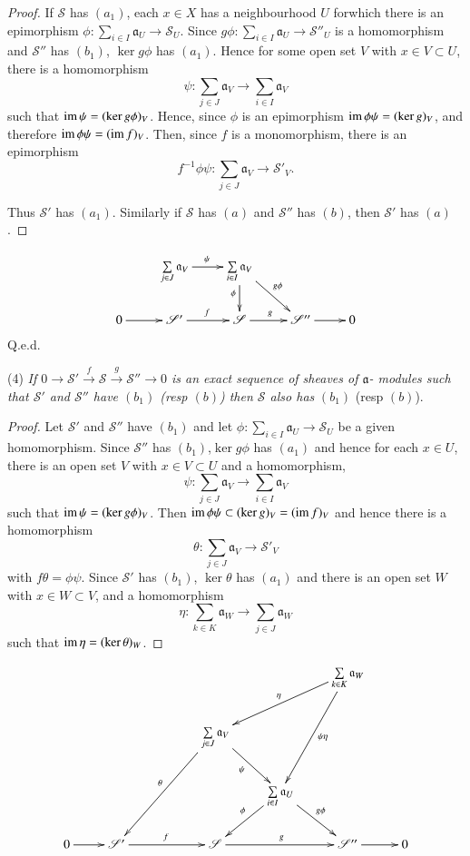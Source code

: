 \begin{proof}
If $\mathscr{S}$ has $(a_1)$, each $x \in X$ has a neighbourhood $U$
for\pageoriginale which there is an epimorphism $\phi : \sum\limits_{i
  \in I} \mathfrak{a}_U 
\to \mathscr{S}_U$. Since $g \phi : \sum \limits_{i \in I} \mathfrak{a}_U \to
\mathscr{S}''_U$ is a homomorphism and $\mathscr{S}''$ has $(b_1)$,
$\ker g \phi $ has $(a_1)$. Hence for some open set $V$ with $x \in V
\subset U$, there is a homomorphism 
$$
\psi: \sum_{j \in J} \mathfrak{a}_V \to \sum_{i \in I} \mathfrak{a}_V
$$
such that $\operatorname{im} \psi = (\ker g \phi )_V$. Hence, since $\phi$ is an
epimorphism $\operatorname{im} \phi \psi = (\ker g)_V$, and therefore $\operatorname{im} \phi \psi
= (\operatorname{im} f)_V$. Then, since $f$ is a monomorphism, there is an
epimorphism 
$$
f^{-1} \phi \psi : \sum_{j \in J} \mathfrak{a}_V \to \mathscr{S}'_V.
$$

Thus $\mathscr{S}'$ has $(a_1)$. Similarly if $\mathscr{S}$ has $(a)$
and $\mathscr{S}''$ has $(b)$, then $\mathscr{S}'$ has $(a)$. 
\end{proof}
\[
\xymatrix{
& \sum\limits_{j\in J} \mathfrak{a}_V \ar[r]^{\psi} & \sum\limits_{i \in I}
  \mathfrak{a}_V \ar[d]_{\phi} \ar[dr]^{g\phi} & & \\
0 \ar[r] & \mathscr{S}' \ar[r]^{f} & \mathscr{S} \ar[r]^g &
\mathscr{S}'' \ar[r] & 0
}
\]
\hfill{Q.e.d.}

\noindent
(4) \qquad \textit{If $0 \to \mathscr{S}' \overset{f}
  \longrightarrow \mathscr{S} \overset{g} \longrightarrow
  \mathscr{S}'' \longrightarrow 0 $ is an exact sequence of sheaves of
  $\mathfrak{a}$- modules such that $\mathscr{S}'$ and $\mathscr{S}''$ have
  $(b_1)$ (resp $(b)$) then $\mathscr{S}$ also has} $(b_1)$ (resp
$(b)$). 

\begin{proof}
Let $\mathscr{S}'$ and $\mathscr{S}''$ have $(b_1)$ and let $\phi :
\sum\limits_{i \in I} \mathfrak{a}_U \to \mathscr{S}_U$ be a given
homomorphism. Since $\mathscr{S}''$ has $(b_1)$,\pageoriginale $\ker g
\phi $ has $(a_1)$ and hence for each $x \in U$, there is an open set
$V$ with $x\in V \subset U$ and a homomorphism, 
$$
\psi : \sum_{j \in J} \mathfrak{a}_V \to \sum_{i \in I} \mathfrak{a}_V
$$
such that $\operatorname{im} \psi = (\ker g \phi)_V$. Then $\operatorname{im} \phi \psi \subset
(\ker g)_V = (\operatorname{im} f)_V$ and hence there is a homomorphism 
$$
\theta : \sum_{j \in J} \mathfrak{a}_V \to \mathscr{S}'_V
$$
with $f \theta = \phi \psi$. Since $\mathscr{S}'$ has $(b_1)$, $\ker
\theta $ has $(a_1)$ and there is an open set $W$ with $x \in W
\subset V$, and a homomorphism 
$$
\eta : \sum_{k \in K} \mathfrak{a}_W \to \sum_{j \in J} \mathfrak{a}_W
$$
such that $\operatorname{im} \eta = (\ker \theta)_W$.
\end{proof}
\[
\xymatrix{
& & & & & \sum\limits_{k\in K} \mathfrak{a}_W \ar[dll]_{\eta}
  \ar[ddl]^{\psi \eta}& \\
& & & \sum\limits_{j\in J} \mathfrak{a}_V
  \ar[dr]_{\psi}\ar[ddll]_{\theta} & & \\ 
& & & &  \sum\limits_{i\in I} \mathfrak{a}_U\ar[dl]_{\phi}\ar[dr]^{g\phi} & & \\
0 \ar[r] & \mathscr{S}'\ar[rr]^f & & \mathscr{S} \ar[rr]^g && 
\mathscr{S}'' \ar[r] & 0
}
\]

